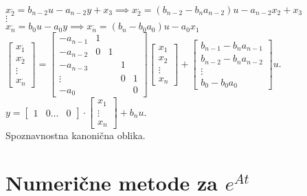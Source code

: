 \documentclass[a4paper, 12pt]{book}
\theoremstyle{definition}
\theoremstyle{remark}
\begin{document}
\begin{enumerate}[label=\arabic*)]
        $x^{.}_2 = b_{n-2} u - a_{n-2} y + x_3 \implies x^{.}_2 = (b_{n-2} - b_n a_{n-2}) u - a_{n-2} x_2 + x_3$ \\
        $\vdots$ \\
        $x^{.}_n = b_0 u - a_0 y \implies x^{.}_n = (b_n - b_0 a_0) u - a_0 x_1$ \\
        $\begin{bmatrix} x^{.}_1 \\ x^{.}_2 \\ \vdots \\ x^{.}_n \end{bmatrix} =
        \begin{bmatrix}
            -a_{n-1} & 1 & & & \\
            -a_{n-2} & 0 & 1 & & \\
            -a_{n-3} & & & 1 & \\
            \vdots & & & 0 & 1 \\
            -a_0 & & & & 0
        \end{bmatrix}
        \begin{bmatrix} x_1 \\ x_2 \\ \vdots \\ x_n \end{bmatrix} +
        \begin{bmatrix} b_{n-1} - b_n a_{n-1} \\  b_{n-2} - b_n a_{n-2} \\ \vdots \\ b_{0} - b_0 a_{0} \end{bmatrix} u$. \\
        $y = \begin{bmatrix} 1 & 0 \dots & 0 \end{bmatrix} \cdot \begin{bmatrix} x_1 \\ \vdots \\ x_n \end{bmatrix}
        + b_n u$. \\
        Spoznavnostna kanonična oblika.
\end{enumerate}



\section{Numerične metode za $e^{At}$}
\end{document}
